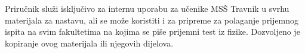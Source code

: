 \chapter*{ }
\vspace{6cm}
Priručnik služi isključivo za internu uporabu za učenike MSŠ Travnik u svrhu materijala za nastavu, ali se može koristiti i za pripreme za polaganje prijemnog ispita na svim fakultetima na kojima se piše prijemni test iz fizike. Dozvoljeno je kopiranje ovog materijala ili njegovih dijelova.\\

